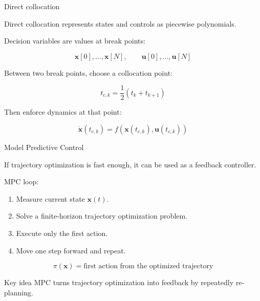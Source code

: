 \documentclass[aspectratio=169]{beamer}
\begin{document}
\begin{frame}{Direct collocation}
\large

Direct collocation represents states and controls as piecewise polynomials.

\vspace{0.3cm}

Decision variables are values at break points:

\[
\bm{x}[0],\ldots,\bm{x}[N],
\qquad
\bm{u}[0],\ldots,\bm{u}[N]
\]

Between two break points, choose a collocation point:

\[
t_{c,k}
=
\frac{1}{2}(t_k+t_{k+1})
\]

Then enforce dynamics at that point:

\[
\dot{\bm{x}}(t_{c,k})
=
f(\bm{x}(t_{c,k}),\bm{u}(t_{c,k}))
\]

\end{frame}

\begin{frame}{Model Predictive Control}
\large

If trajectory optimization is fast enough, it can be used as a feedback controller.

\vspace{0.3cm}

MPC loop:

\begin{enumerate}
    \item Measure current state $\bm{x}(t)$.
    \item Solve a finite-horizon trajectory optimization problem.
    \item Execute only the first action.
    \item Move one step forward and repeat.
\end{enumerate}

\vspace{0.4cm}

\[
\pi(\bm{x})
=
\text{first action from the optimized trajectory}
\]

\vspace{0.3cm}

\begin{block}{Key idea}
MPC turns trajectory optimization into feedback by repeatedly re-planning.
\end{block}

\end{frame}
\end{document}
